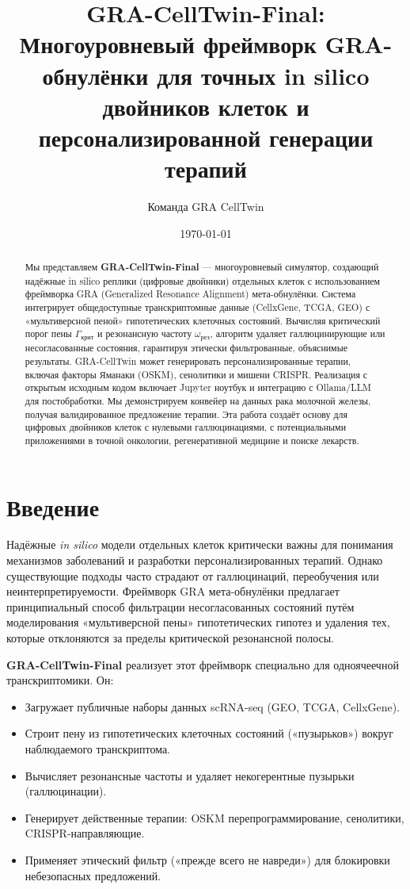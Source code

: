 \documentclass[12pt,a4paper]{article}
\title{GRA-CellTwin-Final: Многоуровневый фреймворк GRA-обнулёнки для точных in silico двойников клеток и персонализированной генерации терапий}
\author{Команда GRA CellTwin}
\date{\today}
\begin{document}
\maketitle

\begin{abstract}
Мы представляем \textbf{GRA-CellTwin-Final} — многоуровневый симулятор, создающий надёжные in silico реплики (цифровые двойники) отдельных клеток с использованием фреймворка GRA (Generalized Resonance Alignment) мета-обнулёнки. Система интегрирует общедоступные транскриптомные данные (CellxGene, TCGA, GEO) с «мультиверсной пеной» гипотетических клеточных состояний. Вычисляя критический порог пены $\Gamma_{\text{крит}}$ и резонансную частоту $\omega_{\text{рез}}$, алгоритм удаляет галлюцинирующие или несогласованные состояния, гарантируя этически фильтрованные, объяснимые результаты. GRA-CellTwin может генерировать персонализированные терапии, включая факторы Яманаки (OSKM), сенолитики и мишени CRISPR. Реализация с открытым исходным кодом включает Jupyter ноутбук и интеграцию с Ollama/LLM для постобработки. Мы демонстрируем конвейер на данных рака молочной железы, получая валидированное предложение терапии. Эта работа создаёт основу для цифровых двойников клеток с нулевыми галлюцинациями, с потенциальными приложениями в точной онкологии, регенеративной медицине и поиске лекарств.
\end{abstract}

\section{Введение}
Надёжные \textit{in silico} модели отдельных клеток критически важны для понимания механизмов заболеваний и разработки персонализированных терапий. Однако существующие подходы часто страдают от галлюцинаций, переобучения или неинтерпретируемости. Фреймворк GRA мета-обнулёнки предлагает принципиальный способ фильтрации несогласованных состояний путём моделирования «мультиверсной пены» гипотетических гипотез и удаления тех, которые отклоняются за пределы критической резонансной полосы.

\textbf{GRA-CellTwin-Final} реализует этот фреймворк специально для одноячеечной транскриптомики. Он:
\begin{itemize}
    \item Загружает публичные наборы данных scRNA-seq (GEO, TCGA, CellxGene).
    \item Строит пену из гипотетических клеточных состояний («пузырьков») вокруг наблюдаемого транскриптома.
    \item Вычисляет резонансные частоты и удаляет некогерентные пузырьки (галлюцинации).
    \item Генерирует действенные терапии: OSKM перепрограммирование, сенолитики, CRISPR-направляющие.
    \item Применяет этический фильтр («прежде всего не навреди») для блокировки небезопасных предложений.
\end{itemize}
\end{document}
